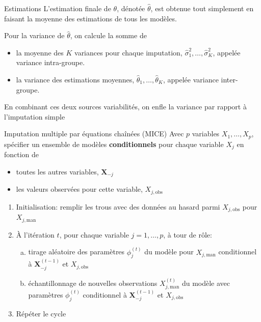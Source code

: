 \documentclass[
  ignorenonframetext,
]{beamer}
\providecommand{\tightlist}{%
  \setlength{\itemsep}{0pt}\setlength{\parskip}{0pt}}\usepackage{longtable,booktabs,array}
\begin{document}
\begin{frame}{Estimations}
\protect\hypertarget{estimations}{}
L'estimation finale de \(\theta\), dénotée \(\widehat{\theta}\), est
obtenue tout simplement en faisant la moyenne des estimations de tous
les modèles.

Pour la variance de \(\widehat{\theta}\), on calcule la somme de

\begin{itemize}
\tightlist
\item
  la moyenne des \(K\) variances pour chaque imputation,
  \(\widehat{\sigma}_1^2, \ldots, \widehat{\sigma}_K^2\), appelée
  variance intra-groupe.
\item
  la variance des estimations moyennes,
  \(\widehat{\theta}_1, \ldots, \widehat{\theta}_K\), appelée variance
  inter-groupe.
\end{itemize}

En combinant ces deux sources variabilités, on enfle la variance par
rapport à l'imputation simple
\end{frame}

\begin{frame}{Imputation multiple par équations chaînées (MICE)}
\protect\hypertarget{imputation-multiple-par-uxe9quations-chauxeenuxe9es-mice}{}
Avec \(p\) variables \(X_1, \ldots, X_p\), spécifier un ensemble de
modèles \textbf{conditionnels} pour chaque variable \(X_j\) en fonction
de

\begin{itemize}
\tightlist
\item
  toutes les autres variables, \(\boldsymbol{X}_{-j}\)
\item
  les valeurs observées pour cette variable, \(X_{j, \text{obs}}\)
\end{itemize}

\begin{enumerate}
\tightlist
\item
  Initialisation: remplir les trous avec des données au hasard parmi
  \(X_{j, \text{obs}}\) pour \(X_{j, \text{man}}\)
\item
  À l'itération \(t\), pour chaque variable \(j=1, \ldots, p\), à tour
  de rôle:

  \begin{enumerate}
  [a)]
  \tightlist
  \item
    tirage aléatoire des paramètres \(\phi_j^{(t)}\) du modèle pour
    \(X_{j,\text{man}}\) conditionnel à \(\boldsymbol{X}_{-j}^{(t-1)}\)
    et \(X_{j, \text{obs}}\)
  \item
    échantillonnage de nouvelles observations \(X^{(t)}_{j,\text{man}}\)
    du modèle avec paramètres \(\phi_j^{(t)}\) conditionnel à
    \(\boldsymbol{X}_{-j}^{(t-1)}\) et \(X_{j, \text{obs}}\)
  \end{enumerate}
\item
  Répéter le cycle
\end{enumerate}
\end{frame}
\end{document}
